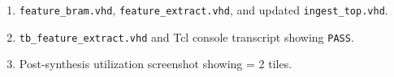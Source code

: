 \documentclass[11pt,letterpaper]{article}
\begin{document}
\begin{tcolorbox}[deliverable={Lab Handout 2-F Deliverable}]
	\begin{enumerate}[leftmargin=1.2em]
		\item \texttt{feature\_bram.vhd}, \texttt{feature\_extract.vhd}, and updated \texttt{ingest\_top.vhd}.
		\item \texttt{tb\_feature\_extract.vhd} and Tcl console transcript showing \texttt{PASS}.
		\item Post-synthesis utilization screenshot showing \BRAM{} = 2 tiles.
	\end{enumerate}
\end{tcolorbox}

\printhandoutglossary
\end{document}
